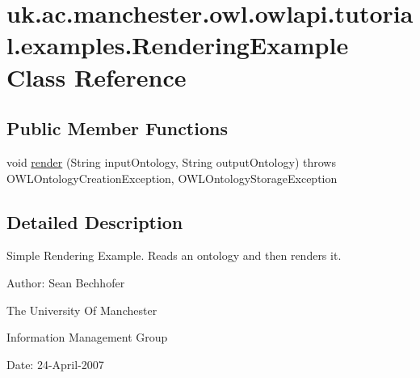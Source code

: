 \hypertarget{classuk_1_1ac_1_1manchester_1_1owl_1_1owlapi_1_1tutorial_1_1examples_1_1_rendering_example}{\section{uk.\-ac.\-manchester.\-owl.\-owlapi.\-tutorial.\-examples.\-Rendering\-Example Class Reference}
\label{classuk_1_1ac_1_1manchester_1_1owl_1_1owlapi_1_1tutorial_1_1examples_1_1_rendering_example}
}
\subsection*{Public Member Functions}
\begin{DoxyCompactItemize}
\item 
void \hyperlink{classuk_1_1ac_1_1manchester_1_1owl_1_1owlapi_1_1tutorial_1_1examples_1_1_rendering_example_afcf7823b0b1d6e097c6ce0e56527643b}{render} (String input\-Ontology, String output\-Ontology)  throws O\-W\-L\-Ontology\-Creation\-Exception, O\-W\-L\-Ontology\-Storage\-Exception 
\end{DoxyCompactItemize}


\subsection{Detailed Description}
Simple Rendering Example. Reads an ontology and then renders it. 

Author\-: Sean Bechhofer\par
 The University Of Manchester\par
 Information Management Group\par
 Date\-: 24-\/\-April-\/2007\par
 \par
 

